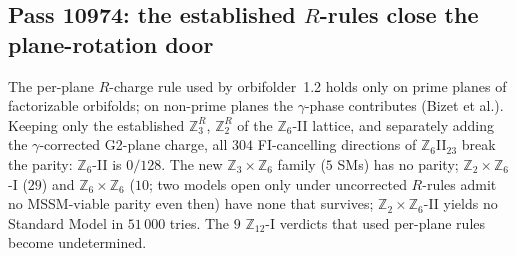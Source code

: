 \subsection{Pass 10974: the established $R$-rules close the plane-rotation door}

The per-plane $R$-charge rule used by orbifolder~1.2 holds only on prime planes of factorizable orbifolds;
on non-prime planes the $\gamma$-phase contributes (Bizet et al.).  Keeping only the established $\mathbb{Z}_3^R$,
$\mathbb{Z}_2^R$ of the $\mathbb{Z}_6$-II lattice, and separately adding the $\gamma$-corrected G2-plane charge, all
$304$ FI-cancelling directions of $\mathbb{Z}_6$II$_{23}$ break the parity: $\mathbb{Z}_6$-II is $0/128$.  The new
$\mathbb{Z}_3\times\mathbb{Z}_6$ family ($5$ SMs) has no parity; $\mathbb{Z}_2\times\mathbb{Z}_6$-I ($29$) and
$\mathbb{Z}_6\times\mathbb{Z}_6$ ($10$; two models open only under uncorrected $R$-rules admit no MSSM-viable parity
even then) have none that survives; $\mathbb{Z}_2\times\mathbb{Z}_6$-II yields no Standard Model in $51\,000$ tries.  The $9$ $\mathbb{Z}_{12}$-I verdicts that used per-plane rules become undetermined.
